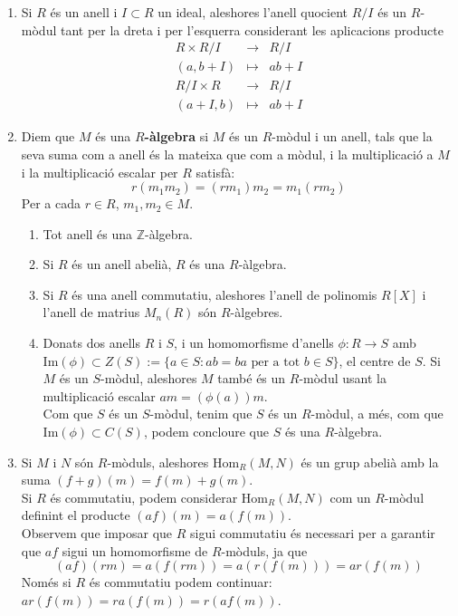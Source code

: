 \begin{enumerate}[(1)]
\item Si $R$ és un anell i $I\subset R$ un ideal, aleshores l'anell quocient $R/I$ és un $R$-mòdul tant per la dreta i per l'esquerra considerant les aplicacions producte
\begin{eqnarray*}
R \times R/I & \rightarrow & R/I \\
(a,b+I) & \mapsto & ab+I
\end{eqnarray*}
\begin{eqnarray*}
R/I \times R & \rightarrow & R/I \\
(a+I,b) & \mapsto & ab+I
\end{eqnarray*}

\item Diem que $M$ és una \textbf{$R$-àlgebra} si $M$ és un $R$-mòdul i un anell, tals que la seva suma com a anell és la mateixa que com a mòdul, i la multiplicació a $M$ i la multiplicació escalar per $R$ satisfà:
$$
r(m_1m_2)=(rm_1)m_2=m_1(rm_2)
$$
Per a cada $r\in R$, $m_1,m_2\in M$.
\begin{enumerate}
\item Tot anell és una $\mathbb{Z}$-àlgebra.
\item Si $R$ és un anell abelià, $R$ és una $R$-àlgebra.
\item Si $R$ és una anell commutatiu, aleshores l'anell de polinomis $R[X]$ i l'anell de matrius $M_n(R)$ són $R$-àlgebres.
\item Donats dos anells $R$ i $S$, i un homomorfisme d'anells $\phi: R \rightarrow S$ amb $\text{Im}(\phi)\subset Z(S):=\{a\in S : ab=ba \text{ per a tot } b\in S\}$, el centre de $S$.  Si $M$ és un $S$-mòdul, aleshores $M$ també és un $R$-mòdul usant la multiplicació escalar $am=(\phi (a))m$. \\
Com que $S$ és un $S$-mòdul, tenim que $S$ és un $R$-mòdul, a més, com que $\text{Im}(\phi)\subset C(S)$, podem concloure que $S$ és una $R$-àlgebra. 
\end{enumerate}
\item Si $M$ i $N$ són $R$-mòduls, aleshores $\text{Hom}_R(M,N)$ és un grup abelià amb la suma $(f+g)(m)=f(m)+g(m)$.\\ Si $R$ és commutatiu, podem considerar $\text{Hom}_R(M,N)$ com un $R$-mòdul definint el producte $(af)(m)=a(f(m))$. \\
Observem que imposar que $R$ sigui commutatiu és necessari per a garantir que $af$ sigui un homomorfisme de $R$-mòduls, ja que 
$$
(af)(rm)=a(f(rm))=a(r(f(m)))=ar(f(m))
$$
Només si $R$ és commutatiu podem continuar: $ar(f(m))=ra(f(m))=r(af(m))$. \\ \\

\end{enumerate}
